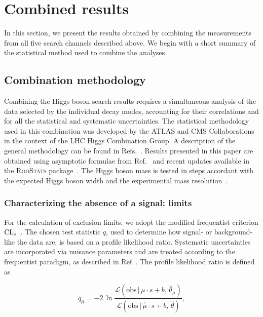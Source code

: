 \documentclass[11pt,twoside,a4paper,cmspaper,final,collab]{cms-tdr}
\begin{document}
\section{Combined results}\label{sec:results}

In this section, we present the results obtained by combining the measurements  from all
five search channels described above.
We begin with a short summary of the statistical method used to combine
the analyses.

\subsection{Combination methodology}
\label{sec:method}
Combining the Higgs boson search results
requires a simultaneous analysis of the data selected by the individual decay modes,
accounting for their correlations and for all the statistical and systematic uncertainties.
The statistical methodology used in this combination was developed
by the ATLAS and CMS Collaborations in the context of the LHC Higgs Combination Group.
A description of the general methodology can be found in Refs.~\cite{LHC-HCG-Report, Chatrchyan:2012tx}.
Results presented in this paper are obtained using asymptotic formulae from Ref.~\cite{Cowan:2010st}
and recent updates available in the \textsc{RooStats} package~\cite{RooStats}.
The Higgs boson mass is tested in steps accordant with the expected Higgs boson width %
and the experimental mass resolution~\cite{LHC-HCG-Report}.

\subsubsection{Characterizing the absence of a signal: limits}

For the calculation of exclusion limits, we adopt the modified frequentist
criterion $\mathrm{CL_s}$~\cite{Junk:1999kv,Read1}. The chosen test statistic $q$, used to determine
how signal- or background-like the data are, is based on a  profile likelihood ratio.
Systematic uncertainties are incorporated via nuisance parameters and
are treated according to the frequentist paradigm, as described in Ref~\cite{LHC-HCG-Report}.
The profile likelihood ratio is defined as

\begin{equation}
q_{\mu} = - 2 \, \ln \frac {\mathcal{L}(\mathrm{obs} \, | \, \mu \cdot s + b, \, \hat \theta_{\mu} ) }
                           {\mathcal{L}(\mathrm{obs} \, | \, \hat \mu \cdot s + b, \, \hat \theta ) } ,
\end{equation}
\end{document}
